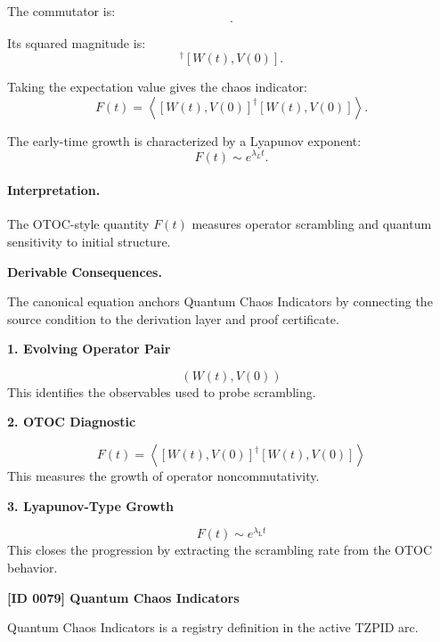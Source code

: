 The commutator is:
\begin{equation}
[W(t),V(0)] .
\end{equation}

Its squared magnitude is:
\begin{equation}
[W(t),V(0)]^\dagger[W(t),V(0)] .
\end{equation}

Taking the expectation value gives the chaos indicator:
\begin{equation}
\boxed{
F(t)
=
\left\langle
[W(t),V(0)]^\dagger
[W(t),V(0)]
\right\rangle .
}
\end{equation}

The early-time growth is characterized by a Lyapunov exponent:
\begin{equation}
F(t)\sim e^{\lambda_L t}.
\end{equation}

\paragraph{Interpretation.}
The OTOC-style quantity $F(t)$ measures operator scrambling and quantum sensitivity to initial structure.

\par\vspace{0.35em}
\noindent\textbf{Derivable Consequences.}\quad
\begingroup
\footnotesize
\raggedright
The canonical equation anchors Quantum Chaos Indicators by connecting the source condition to the derivation layer and proof certificate.
\par\endgroup

\noindent\textbf{1. Evolving Operator Pair}\par
\[
(W(t),V(0))
\]
\noindent This identifies the observables used to probe scrambling.\par
\noindent\textbf{2. OTOC Diagnostic}\par
\[
F(t)
=
\left\langle
\left[W(t),V(0)\right]^{\dagger}
\left[W(t),V(0)\right]
\right\rangle
\]
\noindent This measures the growth of operator noncommutativity.\par
\noindent\textbf{3. Lyapunov-Type Growth}\par
\[
F(t) \sim e^{\lambda_{\mathrm{L}} t}
\]
\noindent This closes the progression by extracting the scrambling rate from the OTOC behavior.\par

\clearpage
\noindent\textbf{[ID 0079] Quantum Chaos Indicators}\par
\vspace{0.35em}
\begingroup\small
{}
Quantum Chaos Indicators is a registry definition in the active TZPID arc.

